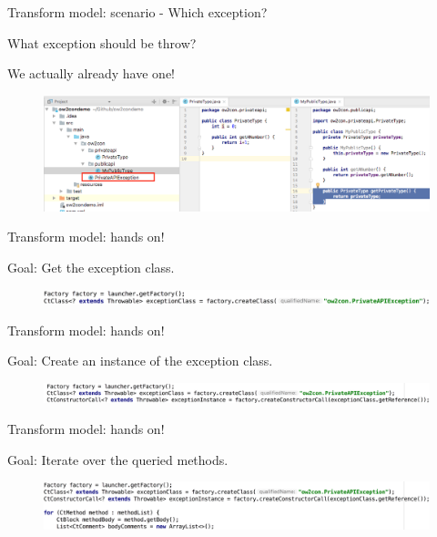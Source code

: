 \documentclass{beamer}
\begin{document}
\begin{frame}[t]{Transform model: scenario - Which exception?}

What exception should be throw?

We actually already have one!
\begin{figure}
\centering
\includegraphics[width=\textwidth]{figures/scenario-exception.png}
\end{figure}
\end{frame}

\begin{frame}[t]{Transform model: hands on!}

Goal: Get the exception class.
\begin{figure}
\centering
\includegraphics[width=\textwidth]{figures/transform/transfo-scenario-1.pdf}
\end{figure}
\end{frame}

\begin{frame}[t]{Transform model: hands on!}

Goal: Create an instance of the exception class.
\begin{figure}
\centering
\includegraphics[width=\textwidth]{figures/transform/transfo-scenario-2.pdf}
\end{figure}
\end{frame}

\begin{frame}[t]{Transform model: hands on!}

Goal: Iterate over the queried methods.
\begin{figure}
\centering
\includegraphics[width=\textwidth]{figures/transform/transfo-scenario-3.pdf}
\end{figure}
\end{frame}
\end{document}
